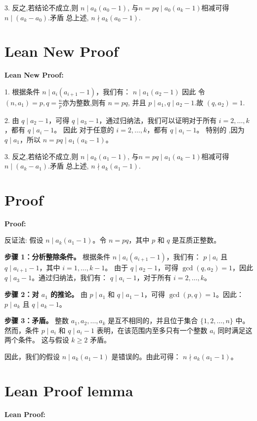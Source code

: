\documentclass[a4paper]{article}
\begin{document}
    3. 反之,若结论不成立,则 $n \mid a_k(a_0 - 1)$, 与$n = pq \mid a_0(a_k - 1)$相减可得 $n \mid (a_k - a_0)$.矛盾
    总上述, $n \nmid a_k(a_0 - 1)$.



\section*{Lean New Proof}
    \textbf{Lean New Proof:}
    
    1. 根据条件 $n \mid a_i(a_{i+1}-1)$，我们有：
    $n \mid a_1(a_2 - 1)$ 因此 令 $(n,a_1) = p,q =\frac{n}{p}$亦为整数,则有 $n = pq$,
    并且 $p \mid a_1,q \mid a_2 - 1$.故 $(q,a_2) = 1$.
    
    2. 由 $q \mid a_2 - 1$，可得 $q \mid a_3 - 1$，通过归纳法，我们可以证明对于所有 $i = 2, \ldots, k$，都有 $q \mid a_i - 1$。
    因此 对于任意的 $i = 2, \ldots, k$，都有 $q \mid a_i - 1$。
    特别的 ,因为 $q \mid a_1$，所以 $n = pq \mid a_1(a_k - 1)$。
    
    3. 反之,若结论不成立,则 $n \mid a_k(a_1 - 1)$, 与$n = pq \mid a_1(a_k - 1)$相减可得 $n \mid (a_k - a_1)$.矛盾
    总上述, $n \nmid a_k(a_1 - 1)$.

\section*{Proof}
    \textbf{Proof:}

    反证法: 假设 $n \mid a_k(a_1-1)$。令 $n = pq$，其中 $p$ 和 $q$ 是互质正整数。

    \textbf{步骤 1：分析整除条件。}  
    根据条件 $n \mid a_i(a_{i+1}-1)$，我们有：
    $p \mid a_i$ 且 $q \mid a_{i+1}-1$，其中 $i = 1, \ldots, k-1$。
    由于 $q \mid a_2-1$，可得 $\gcd(q, a_2) = 1$，因此 $q \mid a_3-1$。通过归纳法，我们有：
    $q \mid a_i-1$，对于所有 $i = 2, \ldots, k$。

    \textbf{步骤 2：对 $a_1$ 的推论。}  
    由 $p \mid a_1$ 和 $q \mid a_1-1$，可得 $\gcd(p, q) = 1$。因此：
    $p \mid a_k$ 且 $q \mid a_k-1$。

    \textbf{步骤 3：矛盾。}  
    整数 $a_1, a_2, \ldots, a_k$ 是互不相同的，并且位于集合 $\{1, 2, \ldots, n\}$ 中。
    然而，条件 $p \mid a_i$ 和 $q \mid a_i-1$ 表明，在该范围内至多只有一个整数 $a_i$ 同时满足这两个条件。
    这与假设 $k \geq 2$ 矛盾。

    因此，我们的假设 $n \mid a_k(a_1-1)$ 是错误的。由此可得：
    $n \nmid a_k(a_1-1)$。

\section*{Lean Proof lemma}
    \textbf{Lean Proof:}
\end{document}
